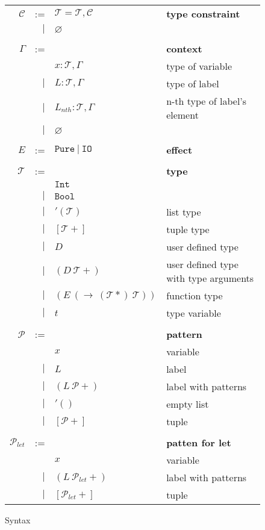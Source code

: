\documentclass{article}
\begin{document}
\begin{figure}[tb]
    \centering
    \begin{tabular}{rrll}
    $\mathcal{C}$ & := & $\mathcal{T} = \mathcal{T}, \mathcal{C}$ & \bf{type constraint} \\
        & $|$ & $\varnothing$ \\ \\

    $\Gamma$ & := & & \bf{context} \\
        &     & $x: \mathcal{T}, \Gamma$ & type of variable \\
        & $|$ & $L: \mathcal{T}, \Gamma$ & type of label \\
        & $|$ & $L_{nth}: \mathcal{T}, \Gamma$ & n-th type of label's element \\
        & $|$ & $\varnothing$ \\ \\

    $E$ & := & $\mathtt{Pure}\ |\ \mathtt{IO}$ & \bf{effect} \\ \\

    $\mathcal{T}$ & := & & \bf{type} \\
        &     & $\mathtt{Int}$ \\
        & $|$ & $\mathtt{Bool}$ \\
        & $|$ & $'(\mathcal{T})$ & list type \\
        & $|$ & $[\mathcal{T}+]$ & tuple type \\
        & $|$ & $D$    & user defined type \\
        & $|$ & $(D\ \mathcal{T}+)$ & user defined type with type arguments \\
        & $|$ & $(E\ (\rightarrow\ (\mathcal{T}*)\ \mathcal{T}))$ & function type \\
        & $|$ & $t$ & type variable \\ \\

    $\mathcal{P}$ & := & & \bf{pattern} \\
        &     & $x$ & variable \\
        & $|$ & $L$ & label \\
        & $|$ & $(L\ \mathcal{P}+)$ & label with patterns \\
        & $|$ & $'()$ & empty list \\
        & $|$ & $[\mathcal{P}+]$ & tuple \\ \\

    $\mathcal{P}_{let}$ & := & & \bf{patten for let} \\
        &     & $x$ & variable \\
        & $|$ & $(L\ \mathcal{P}_{let}+)$ & label with patterns \\
        & $|$ & $[\mathcal{P}_{let}+]$ & tuple \\
    \end{tabular}
    \caption{Syntax}
    \label{fig:syntax}
\end{figure}
\end{document}
